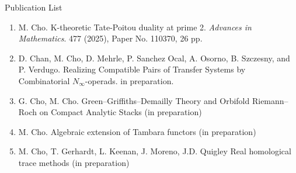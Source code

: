 \documentclass[11pt]{article}
\begin{document}

\begin{center}
\LARGE{Publication List}
\end{center}
\begin{enumerate}
    \item M. Cho. {K-theoretic Tate-Poitou duality at prime 2}. {\it Advances in Mathematics}. 477 (2025), Paper No. 110370, 26 pp. 
    
     \item D. Chan, M. Cho, D. Mehrle, P. Sanchez Ocal, A. Osorno, B. Szczesny, and P. Verdugo. Realizing Compatible Pairs of Transfer Systems by Combinatorial $N_\infty$-operads. in preparation.


    \item G. Cho, M. Cho.  Green–Griffiths–Demailly Theory and Orbifold Riemann–Roch on Compact Analytic Stacks (in preparation)


    \item M. Cho.  Algebraic extension of Tambara functors (in preparation)

    \item M. Cho, T. Gerhardt, L. Keenan, J. Moreno, J.D. Quigley Real homological trace methods (in preparation)
\end{enumerate}
\end{document}
